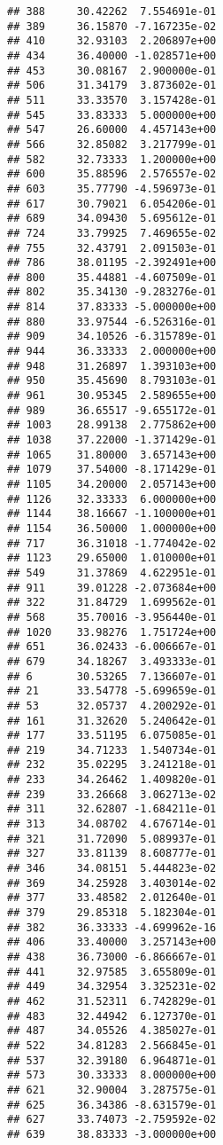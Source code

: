\documentclass[
]{article}
\begin{document}
\begin{verbatim}
## 388     30.42262  7.554691e-01
## 389     36.15870 -7.167235e-02
## 410     32.93103  2.206897e+00
## 434     36.40000 -1.028571e+00
## 453     30.08167  2.900000e-01
## 506     31.34179  3.873602e-01
## 511     33.33570  3.157428e-01
## 545     33.83333  5.000000e+00
## 547     26.60000  4.457143e+00
## 566     32.85082  3.217799e-01
## 582     32.73333  1.200000e+00
## 600     35.88596  2.576557e-02
## 603     35.77790 -4.596973e-01
## 617     30.79021  6.054206e-01
## 689     34.09430  5.695612e-01
## 724     33.79925  7.469655e-02
## 755     32.43791  2.091503e-01
## 786     38.01195 -2.392491e+00
## 800     35.44881 -4.607509e-01
## 802     35.34130 -9.283276e-01
## 814     37.83333 -5.000000e+00
## 880     33.97544 -6.526316e-01
## 909     34.10526 -6.315789e-01
## 944     36.33333  2.000000e+00
## 948     31.26897  1.393103e+00
## 950     35.45690  8.793103e-01
## 961     30.95345  2.589655e+00
## 989     36.65517 -9.655172e-01
## 1003    28.99138  2.775862e+00
## 1038    37.22000 -1.371429e-01
## 1065    31.80000  3.657143e+00
## 1079    37.54000 -8.171429e-01
## 1105    34.20000  2.057143e+00
## 1126    32.33333  6.000000e+00
## 1144    38.16667 -1.100000e+01
## 1154    36.50000  1.000000e+00
## 717     36.31018 -1.774042e-02
## 1123    29.65000  1.010000e+01
## 549     31.37869  4.622951e-01
## 911     39.01228 -2.073684e+00
## 322     31.84729  1.699562e-01
## 568     35.70016 -3.956440e-01
## 1020    33.98276  1.751724e+00
## 651     36.02433 -6.006667e-01
## 679     34.18267  3.493333e-01
## 6       30.53265  7.136607e-01
## 21      33.54778 -5.699659e-01
## 53      32.05737  4.200292e-01
## 161     31.32620  5.240642e-01
## 177     33.51195  6.075085e-01
## 219     34.71233  1.540734e-01
## 232     35.02295  3.241218e-01
## 233     34.26462  1.409820e-01
## 239     33.26668  3.062713e-02
## 311     32.62807 -1.684211e-01
## 313     34.08702  4.676714e-01
## 321     31.72090  5.089937e-01
## 327     33.81139  8.608777e-01
## 346     34.08151  5.444823e-02
## 369     34.25928  3.403014e-02
## 377     33.48582  2.012640e-01
## 379     29.85318  5.182304e-01
## 382     36.33333 -4.699962e-16
## 406     33.40000  3.257143e+00
## 438     36.73000 -6.866667e-01
## 441     32.97585  3.655809e-01
## 449     34.32954  3.325231e-02
## 462     31.52311  6.742829e-01
## 483     32.44942  6.127370e-01
## 487     34.05526  4.385027e-01
## 522     34.81283  2.566845e-01
## 537     32.39180  6.964871e-01
## 573     30.33333  8.000000e+00
## 621     32.90004  3.287575e-01
## 625     36.34386 -8.631579e-01
## 627     33.74073 -2.759592e-02
## 639     38.83333 -3.000000e+00

\end{verbatim}
\end{document}

